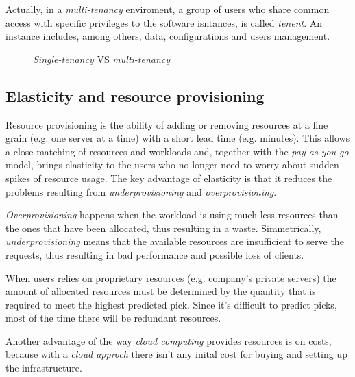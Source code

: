 Actually, in a \emph{multi-tenancy} enviroment, a group of users who share
common access with specific privileges to the software isntances, is called
\emph{tenent}. An instance includes, among others, data, configurations and
users management.

\newpage
\begin{figure}[ht!]
    \centering
    \hspace{2mm}
    \hspace{2mm}
    \caption{\emph{Single-tenancy} VS \emph{multi-tenancy}}
\end{figure}

\subsection{Elasticity and resource provisioning}
Resource provisioning is the ability of adding or removing resources at a fine
grain (e.g. one server at a time) with a short lead time (e.g. minutes). This
allows a close matching of resources and workloads and, together with the
\emph{pay-as-you-go} model, brings elasticity to the users who no longer need
to worry about sudden spikes of resource usage. The key advantage of elasticity
is that it reduces the problems resulting from \emph{underprovisioning} and
\emph{overprovisioning}.

\emph{Overprovisioning} happens when the workload is using much less resources
than the ones that have been allocated, thus resulting in a waste.
Simmetrically, \emph{underprovisioning} means that the available resources are
insufficient to serve the requests, thus resulting in bad performance and
possible loss of clients.

When users relies on proprietary resources (e.g. company's private servers) the
amount of allocated resources must be determined by the quantity that is
required to meet the highest predicted pick. Since it's difficult to predict
picks, most of the time there will be redundant resources.

Another advantage of the way \emph{cloud computing} provides resources is on costs,
because with a \emph{cloud approch} there isn't any inital cost for buying and
setting up the infrastructure.

